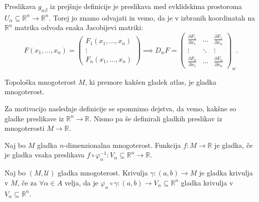 \begin{opomba}
Preslikava $g_{\alpha \beta}$  iz prejšnje definicije
je preslikava med evklidskima prostoroma $U_\alpha \subseteq \mathbb{R}^n \to
\mathbb{R}^n$. Torej jo znamo odvajati in vemo, da je v izbranih
koordinatah na $\mathbb{R}^n$ matrika odvoda enaka Jacobijevi
matriki: \begin{equation*} F\left( x_1, \ldots, x_{n} \right) =
\begin{pmatrix}
F_1(x_1, \dots, x_n)\\ \vdots\\ F_n(x_1, \dots, x_n)
\end{pmatrix}
\implies D_wF = \begin{pmatrix}
\frac{\partial F_1}{\partial x_1} & \dots & \frac{\partial
F_1}{\partial x_n} \\ \vdots & \ddots & \vdots \\
\frac{\partial F_n}{\partial x_1} & \dots & \frac{\partial
F_n}{\partial x_n} \end{pmatrix}_w	. \end{equation*}
\end{opomba}

\begin{definicija}
\label{def_gladka_mnt}
Topološka mnogoterost $M$,
ki premore kakšen gladek atlas, je gladka mnogoterost.
\end{definicija}

Za motivacijo naslednje definicije se spomnimo dejstva, da vemo,
kakšne so gladke preslikave iz $\mathbb{R}^n \to  \mathbb{R}$. Nismo
pa še definirali gladkih preslikav iz mnogoterosti $M \to \mathbb{R}$. 

\begin{definicija}
\label{def_gladke_preslikave}
Naj bo $M$ gladka $n$-dimenzionalna mnogoterost. Funkcija $f : M \to  \mathbb{R}$ je
gladka, če je gladka vsaka preslikava $f \circ \varphi_\alpha^{-1}
: V_\alpha \subseteq \mathbb{R}^n \to  \mathbb{R}$.
\end{definicija}


\begin{definicija}
\label{def_gladka_krivulja}
Naj bo $\left( M,\mathcal{U} \right)$  gladka mnogoterost. Krivulja $\gamma :
\left( a, b \right) \to  M$ je gladka krivulja v $M$, če za
$\forall  \alpha \in A$ velja, da je $\varphi_\alpha \circ \gamma
: \left( a, b \right) \to  V_\alpha \subseteq \mathbb{R}^n$ gladka
krivulja v $V_\alpha \subseteq  \mathbb{R}^n$.
\end{definicija}

